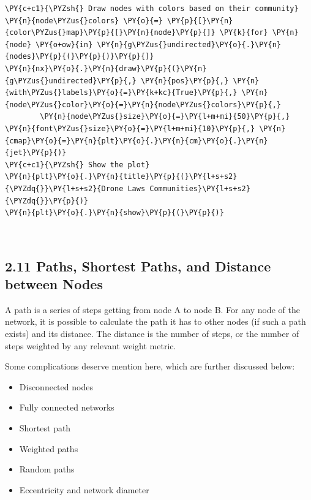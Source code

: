 \begin{tcolorbox}[breakable, size=fbox, boxrule=1pt, pad at break*=1mm,colback=cellbackground, colframe=cellborder]
\begin{Verbatim}[commandchars=\\\{\}]
\PY{c+c1}{\PYZsh{} Draw nodes with colors based on their community}
\PY{n}{node\PYZus{}colors} \PY{o}{=} \PY{p}{[}\PY{n}{color\PYZus{}map}\PY{p}{[}\PY{n}{node}\PY{p}{]} \PY{k}{for} \PY{n}{node} \PY{o+ow}{in} \PY{n}{g\PYZus{}undirected}\PY{o}{.}\PY{n}{nodes}\PY{p}{(}\PY{p}{)}\PY{p}{]}
\PY{n}{nx}\PY{o}{.}\PY{n}{draw}\PY{p}{(}\PY{n}{g\PYZus{}undirected}\PY{p}{,} \PY{n}{pos}\PY{p}{,} \PY{n}{with\PYZus{}labels}\PY{o}{=}\PY{k+kc}{True}\PY{p}{,} \PY{n}{node\PYZus{}color}\PY{o}{=}\PY{n}{node\PYZus{}colors}\PY{p}{,} 
        \PY{n}{node\PYZus{}size}\PY{o}{=}\PY{l+m+mi}{50}\PY{p}{,} \PY{n}{font\PYZus{}size}\PY{o}{=}\PY{l+m+mi}{10}\PY{p}{,} \PY{n}{cmap}\PY{o}{=}\PY{n}{plt}\PY{o}{.}\PY{n}{cm}\PY{o}{.}\PY{n}{jet}\PY{p}{)}
\PY{c+c1}{\PYZsh{} Show the plot}
\PY{n}{plt}\PY{o}{.}\PY{n}{title}\PY{p}{(}\PY{l+s+s2}{\PYZdq{}}\PY{l+s+s2}{Drone Laws Communities}\PY{l+s+s2}{\PYZdq{}}\PY{p}{)}
\PY{n}{plt}\PY{o}{.}\PY{n}{show}\PY{p}{(}\PY{p}{)}
\end{Verbatim}
\end{tcolorbox}

    \begin{center}
    \end{center}
    { \hspace*{\fill} \\}
    
    \hypertarget{paths-shortest-paths-and-distance-between-nodes}{%
\subsection{2.11 Paths, Shortest Paths, and Distance between
Nodes}\label{paths-shortest-paths-and-distance-between-nodes}}

A path is a series of steps getting from node A to node B. For any node
of the network, it is possible to calculate the path it has to other
nodes (if such a path exists) and its distance. The distance is the
number of steps, or the number of steps weighted by any relevant weight
metric.

Some complications deserve mention here, which are further discussed
below:

\begin{itemize}
\tightlist
\item
  Disconnected nodes
\item
  Fully connected networks
\item
  Shortest path
\item
  Weighted paths
\item
  Random paths
\item
  Eccentricity and network diameter
\end{itemize}

